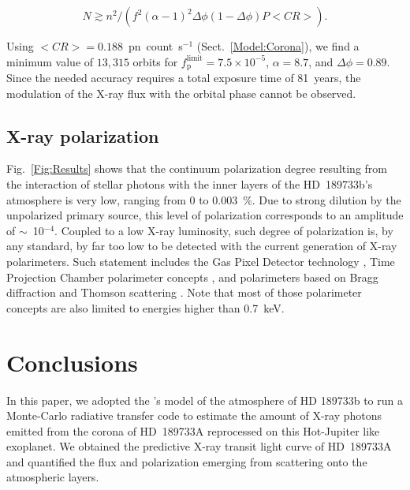 \documentclass[iop]{emulateapj}
\begin{document}
\begin{equation}
N \gtrsim n^2/(f^2(\alpha-1)^2\Delta\phi(1-\Delta\phi)P<\!CR\!>).
\end{equation}

Using $<\!CR\!>=0.188$~pn~count~s$^{-1}$ (Sect.~\ref{Model:Corona}), we find a minimum value of $13,315$ orbits for $f^\mathrm{limit}_\mathrm{p}=7.5\times10^{-5}$, 
$\alpha=8.7$, and $\Delta\phi=0.89$. Since the needed accuracy requires a total exposure time of 81~years, the modulation of the X-ray flux with 
the orbital phase cannot be observed.

\subsection{X-ray polarization}


Fig.~\ref{Fig:Results} shows that the continuum polarization degree resulting from the interaction of stellar photons with the inner layers of 
the HD~189733b's atmosphere is very low, ranging from 0 to 0.003~\%. Due to strong dilution by the unpolarized primary source, this level 
of polarization corresponds to an amplitude of $\sim$~10$^{-4}$. Coupled to a low X-ray luminosity, such degree of polarization is, by any standard, 
by far too low to be detected with the current generation of X-ray polarimeters. Such statement includes the Gas Pixel Detector technology \citep{Soffitta2013}, 
Time Projection Chamber polarimeter concepts \citep{Black2010}, and polarimeters based on Bragg diffraction and Thomson scattering \citep{Kaaret1989}. 
Note that most of those polarimeter concepts are also limited to energies higher than 0.7~keV. 




\section{Conclusions}
\label{Conclusion}

In this paper, we adopted the \cite{Salz2016}'s model of the atmosphere of HD 189733b to run a Monte-Carlo radiative transfer code to 
estimate the amount of X-ray photons emitted from the corona of HD~189733A reprocessed on this Hot-Jupiter like exoplanet. We obtained the 
predictive X-ray transit light curve of HD~189733A and quantified the flux and polarization emerging from scattering onto the atmospheric 
layers.
\end{document}

